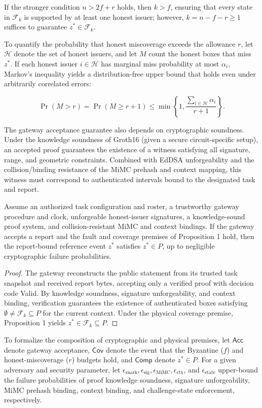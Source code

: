If the stronger condition $n > 2f + r$ holds, then $k > f$, ensuring that every state in $\mathcal{F}_k$ is supported by at least one honest issuer; however, $k = n - f - r \ge 1$ suffices to guarantee $z^* \in \mathcal{F}_k$.

To quantify the probability that honest miscoverage exceeds the allowance $r$, let $\mathcal{H}$ denote the set of honest issuers, and let $M$ count the honest boxes that miss $z^*$. If each honest issuer $i \in \mathcal{H}$ has marginal miss probability at most $\alpha_i$, Markov's inequality yields a distribution-free upper bound that holds even under arbitrarily correlated errors:


\begin{equation}\label{eq:calibration}
\Pr(M > r) = \Pr(M \ge r + 1) \le \min\left\{ 1, \frac{\sum_{i \in \mathcal{H}} \alpha_i}{r + 1} \right\}.
\end{equation}

The gateway acceptance guarantee also depends on cryptographic soundness. Under the knowledge soundness of Groth16 (given a secure circuit-specific setup), an accepted proof guarantees the existence of a witness satisfying all signature, range, and geometric constraints. Combined with EdDSA unforgeability and the collision/binding resistance of the MiMC prehash and context mapping, this witness must correspond to authenticated intervals bound to the designated task and report.

\begin{proposition}\label{prop:gateway}
Assume an authorized task configuration and roster, a trustworthy gateway procedure and clock, unforgeable honest-issuer signatures, a knowledge-sound proof system, and collision-resistant MiMC and context bindings. If the gateway accepts a report and the fault and coverage premises of Proposition 1 hold, then the report-bound reference event $z^*$ satisfies $z^* \in P$, up to negligible cryptographic failure probabilities.
\end{proposition}
\begin{proof}
The gateway reconstructs the public statement from its trusted task snapshot and received report bytes, accepting only a verified proof with decision code Valid. By knowledge soundness, signature unforgeability, and context binding, verification guarantees the existence of authenticated boxes satisfying $\emptyset \neq \mathcal{F}_k \subseteq P$ for the current context. Under the physical coverage premise, Proposition 1 yields $z^* \in \mathcal{F}_k \subseteq P$.
\end{proof}

To formalize the composition of cryptographic and physical premises, let $\mathsf{Acc}$ denote gateway acceptance, $\mathsf{Cov}$ denote the event that the Byzantine ($f$) and honest-miscoverage ($r$) budgets hold, and $\mathsf{Comp}$ denote $z^* \in P$. For a given adversary and security parameter, let $\epsilon_{\mathrm{snark}}, \epsilon_{\mathrm{sig}}, \epsilon_{\mathrm{MiMC}}, \epsilon_{\mathrm{ctx}}$, and $\epsilon_{\mathrm{state}}$ upper-bound the failure probabilities of proof knowledge soundness, signature unforgeability, MiMC prehash binding, context binding, and challenge-state enforcement, respectively.
